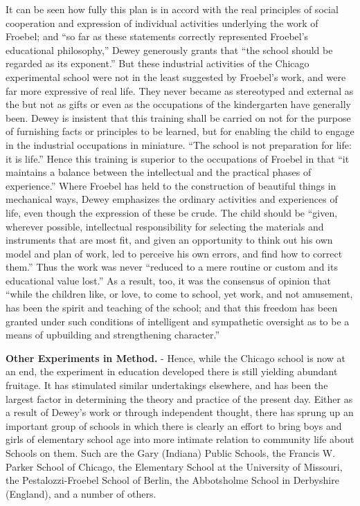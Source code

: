\documentclass[]{book}
\begin{document}
It can be seen how fully this plan is in accord with the real principles of social cooperation and expression of individual activities underlying the work of Froebel; and ``so far as these statements correctly represented Froebel's educational philosophy,'' Dewey generously grants that ``the school should be regarded as its exponent.'' But these industrial activities of the Chicago experimental school were not in the least suggested by Froebel's work, and were far more expressive of real life. They never became as stereotyped and external as the but not as gifts or even as the occupations of the kindergarten have generally been. Dewey is insistent that this training shall be carried on not for the purpose of furnishing facts or principles to be learned, but for enabling the child to engage in the industrial occupations in miniature. ``The school is not preparation for life: it is life.'' Hence this training is superior to the occupations of Froebel in that ``it maintains a balance between the intellectual and the practical phases of experience.'' Where Froebel has held to the construction of beautiful things in mechanical ways, Dewey emphasizes the ordinary activities and experiences of life, even though the expression of these be crude. The child should be ``given, wherever possible, intellectual responsibility for selecting the materials and instruments that are most fit, and given an opportunity to think out his own model and plan of work, led to perceive his own errors, and find how to correct them.'' Thus the work was never ``reduced to a mere routine or custom and its educational value lost.'' As a result, too, it was the consensus of opinion that ``while the children like, or love, to come to school, yet work, and not amusement, has been the spirit and teaching of the school; and that this freedom has been granted under such conditions of intelligent and sympathetic oversight as to be a means of upbuilding and strengthening character.''

\textbf{Other Experiments in Method.} - Hence, while the Chicago school is now at an end, the experiment in education developed there is still yielding abundant fruitage. It has stimulated similar undertakings elsewhere, and has been the largest factor in determining the theory and practice of the present day. Either as a result of Dewey's work or through independent thought, there has sprung up an important group of schools in which there is clearly an effort to bring boys and girls of elementary school age into more intimate relation to community life about Schools on them. Such are the Gary (Indiana) Public Schools, the Francis W. Parker School of Chicago, the Elementary School at the University of Missouri, the Pestalozzi-Froebel School of Berlin, the Abbotsholme School in Derbyshire (England), and a number of others.
\end{document}
